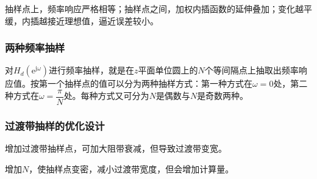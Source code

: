 \documentclass[cn, hazy, blue, normal, 14pt]{elegantnote}
\begin{document}
抽样点上，频率响应严格相等；抽样点之间，加权内插函数的延伸叠加；变化越平缓，内插越接近理想值，逼近误差较小。

\subsubsection{两种频率抽样}

对$H_d\left(\text{e}^{\text{j}\omega}\right)$进行频率抽样，就是在$z$平面单位圆上的$N$个等间隔点上抽取出频率响应值。按第一个抽样点的值可以分为两种抽样方式：第一种方式在$\omega=0$处，第二种方式在$\omega=\dfrac{\pi}{N}$处。每种方式又可分为$N$是偶数与$N$是奇数两种。

\subsubsection{过渡带抽样的优化设计}

增加过渡带抽样点，可加大阻带衰减，但导致过渡带变宽。

增加$N$，使抽样点变密，减小过渡带宽度，但会增加计算量。
\end{document}
